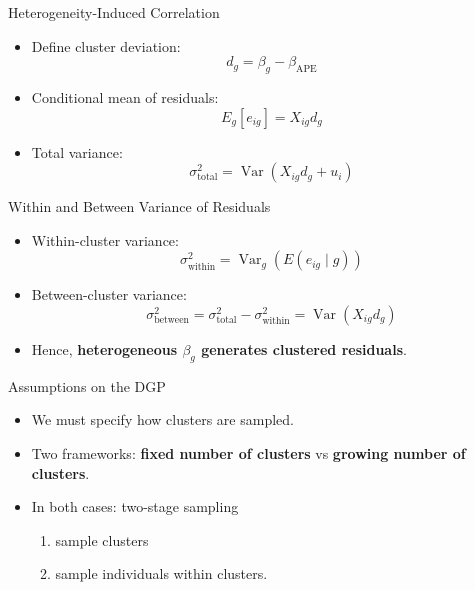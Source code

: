 \documentclass[
  ignorenonframetext,
]{beamer}
\providecommand{\tightlist}{%
  \setlength{\itemsep}{0pt}\setlength{\parskip}{0pt}}
\begin{document}
\begin{frame}{Heterogeneity-Induced Correlation}
\label{heterogeneity-induced-correlation}
\begin{itemize}
\tightlist
\item
  Define cluster deviation:\\
  \[
  d_g = \beta_g - \beta_{\text{APE}}
  \]
\item
  Conditional mean of residuals:\\
  \[
  E_g[e_{ig}] = X_{ig} d_g
  \]
\item
  Total variance:\\
  \[
  \sigma^2_{\text{total}}
  = \operatorname{Var}(X_{ig}d_g + u_i)
  \]
\end{itemize}
\end{frame}

\begin{frame}{Within and Between Variance of Residuals}
\label{within-and-between-variance-of-residuals}
\begin{itemize}
\tightlist
\item
  Within-cluster variance:\\
  \[
  \sigma^2_{\text{within}}
  = \operatorname{Var}_g(E(e_{ig}\mid g))
  \]
\item
  Between-cluster variance:\\
  \[
  \sigma^2_{\text{between}}
  = \sigma^2_{\text{total}} - \sigma^2_{\text{within}}
  = \operatorname{Var}(X_{ig}d_g)
  \]
\item
  Hence, \textbf{heterogeneous \(\beta_g\) generates clustered
  residuals}.
\end{itemize}
\end{frame}

\begin{frame}{Assumptions on the DGP}
\label{assumptions-on-the-dgp}
\begin{itemize}
\tightlist
\item
  We must specify how clusters are sampled.\\
\item
  Two frameworks: \textbf{fixed number of clusters} vs \textbf{growing
  number of clusters}.\\
\item
  In both cases: two-stage sampling

  \begin{enumerate}
  \tightlist
  \item
    sample clusters\\
  \item
    sample individuals within clusters.
  \end{enumerate}
\end{itemize}
\end{frame}
\end{document}
